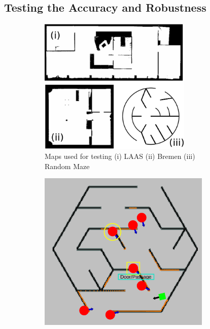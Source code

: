 \subsection{Testing the Accuracy and Robustness}
\begin{figure}[h!]
\centering
\begin{subfigure}[t]{0.45\columnwidth}
  \centering
  \includegraphics[width=0.8\textwidth]{images/chapter5/maps.png}
  \caption{Maps used for testing (i) LAAS (ii) Bremen (iii) Random Maze}
\end{subfigure}
\hspace{-0.17cm}
\begin{subfigure}[t]{0.45\columnwidth}
  \includegraphics[width=0.9\textwidth]{images/chapter5/passage_detect_fail.png} 

\end{subfigure}
\end{figure}
